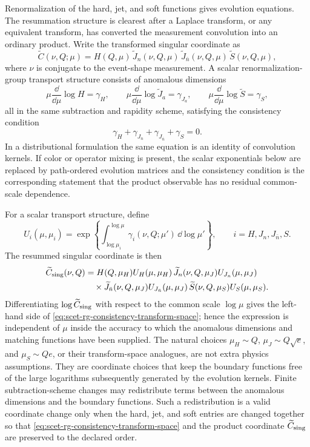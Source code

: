 Renormalization of the hard, jet, and soft functions gives evolution
equations.  The resummation structure is clearest after a Laplace transform, or
any equivalent transform, has converted the measurement convolution into an
ordinary product.  Write the transformed singular coordinate as
\[
  \widetilde C(\nu,Q;\mu)
  =
  H(Q,\mu)\,
  \widetilde J_n(\nu,Q,\mu)\,
  \widetilde J_{\bar n}(\nu,Q,\mu)\,
  \widetilde S(\nu,Q,\mu),
\]
where \(\nu\) is conjugate to the event-shape measurement.  A scalar
renormalization-group transport structure consists of anomalous dimensions
\[
  \mu\frac{\dd}{\dd\mu}\log H=\gamma_H,\qquad
  \mu\frac{\dd}{\dd\mu}\log \widetilde J_a=\gamma_{J_a},\qquad
  \mu\frac{\dd}{\dd\mu}\log \widetilde S=\gamma_S ,
\]
all in the same subtraction and rapidity scheme, satisfying the consistency
condition
\begin{equation}
  \gamma_H+\gamma_{J_n}+\gamma_{J_{\bar n}}+\gamma_S=0 .
  \label{eq:scet-rg-consistency-transform-space}
\end{equation}
In a distributional formulation the same equation is an identity of
convolution kernels.  If color or operator mixing is present, the scalar
exponentials below are replaced by path-ordered evolution matrices and the
consistency condition is the corresponding statement that the product
observable has no residual common-scale dependence.

For a scalar transport structure, define
\[
  U_i(\mu,\mu_i)
  =
  \exp\!\left\{
    \int_{\log\mu_i}^{\log\mu}\gamma_i(\nu,Q;\mu')\,\dd\log\mu'
  \right\},
  \qquad
  i=H,J_n,J_{\bar n},S .
\]
The resummed singular coordinate is then
\begin{equation}
\begin{aligned}
  \widetilde C_{\rm sing}(\nu,Q)
  &=
  H(Q,\mu_H)U_H(\mu,\mu_H)\,
  \widetilde J_n(\nu,Q,\mu_J)U_{J_n}(\mu,\mu_J)
\\
  &\quad\times
  \widetilde J_{\bar n}(\nu,Q,\mu_J)U_{J_{\bar n}}(\mu,\mu_J)\,
  \widetilde S(\nu,Q,\mu_S)U_S(\mu,\mu_S).
  \label{eq:scet-resummed-transport-coordinate}
\end{aligned}
\end{equation}
Differentiating \(\log\widetilde C_{\rm sing}\) with respect to the common
scale \(\log\mu\) gives the left-hand side of
\eqref{eq:scet-rg-consistency-transform-space}; hence the expression is
independent of \(\mu\) inside the accuracy to which the anomalous dimensions
and matching functions have been supplied.  The natural choices
\(\mu_H\sim Q\), \(\mu_J\sim Q\sqrt e\), and \(\mu_S\sim Qe\), or their
transform-space analogues, are not extra physics assumptions.  They are
coordinate choices that keep the boundary functions free of the large
logarithms subsequently generated by the evolution kernels.
Finite subtraction-scheme changes may redistribute terms between the
anomalous dimensions and the boundary functions.  Such a redistribution is a
valid coordinate change only when the hard, jet, and soft entries are changed
together so that \eqref{eq:scet-rg-consistency-transform-space} and the
product coordinate \(\widetilde C_{\rm sing}\) are preserved to the declared
order.

